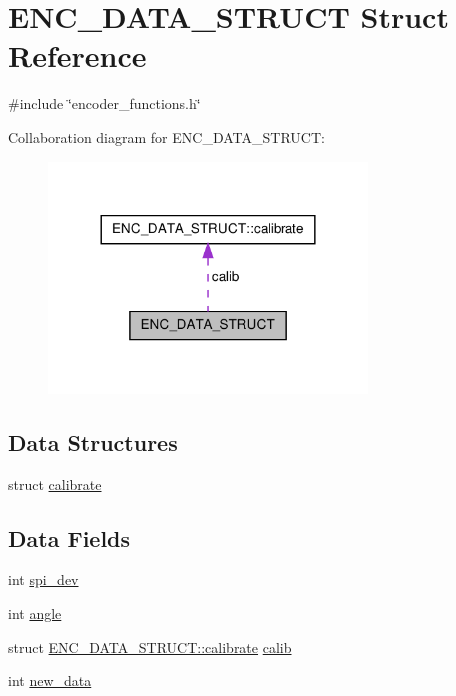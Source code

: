 \hypertarget{structENC__DATA__STRUCT}{\section{E\-N\-C\-\_\-\-D\-A\-T\-A\-\_\-\-S\-T\-R\-U\-C\-T Struct Reference}
\label{structENC__DATA__STRUCT}
}


{\ttfamily \#include \char`\"{}encoder\-\_\-functions.\-h\char`\"{}}



Collaboration diagram for E\-N\-C\-\_\-\-D\-A\-T\-A\-\_\-\-S\-T\-R\-U\-C\-T\-:
\nopagebreak
\begin{figure}[H]
\begin{center}
\leavevmode
\includegraphics[width=240pt]{structENC__DATA__STRUCT__coll__graph}
\end{center}
\end{figure}
\subsection*{Data Structures}
\begin{DoxyCompactItemize}
\item 
struct \hyperlink{structENC__DATA__STRUCT_1_1calibrate}{calibrate}
\end{DoxyCompactItemize}
\subsection*{Data Fields}
\begin{DoxyCompactItemize}
\item 
int \hyperlink{structENC__DATA__STRUCT_a93b8e925392a12a8874bf59f2a1cd76a}{spi\-\_\-dev}
\item 
int \hyperlink{structENC__DATA__STRUCT_ad25beb30fd5b975292f87db02ec9930a}{angle}
\item 
struct \hyperlink{structENC__DATA__STRUCT_1_1calibrate}{E\-N\-C\-\_\-\-D\-A\-T\-A\-\_\-\-S\-T\-R\-U\-C\-T\-::calibrate} \hyperlink{structENC__DATA__STRUCT_af227e5bbb714b830cc570432bda0a468}{calib}
\item 
int \hyperlink{structENC__DATA__STRUCT_adbfb6e5764f0e3c42f4e212deb5d1f21}{new\-\_\-data}
\end{DoxyCompactItemize}


